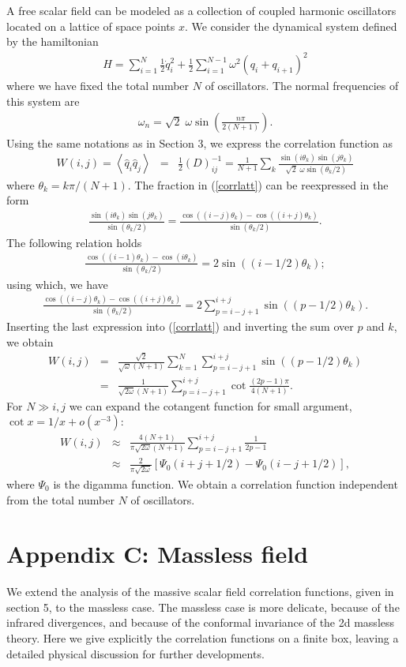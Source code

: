 \documentclass[10pt, nofootinbib]{revtex4}
\newcommand{\bea}{\begin{eqnarray}}
\newcommand{\eea}{\end{eqnarray}}
\begin{document}
A free scalar field can be modeled as a collection of coupled harmonic
oscillators located on a lattice of space points $x$.  We consider the
dynamical system defined by the hamiltonian
%
\bea H= \sum_{i=1}^{N}\frac{1}{2}\dot{q}_i^2 +
\frac{1}{2}\sum_{i=1}^{N-1} \omega^2 \left( q_i+ q_{i+1} \right)^2
\eea
%
where we have fixed the total number $N$ of oscillators.  The normal
frequencies of this system are
%
\bea \omega_{n} = \sqrt{2} \; \omega \sin \left(\frac{n \pi}{2(N+1)}
\right).  \eea
%
Using the same notations as in Section 3, we express the
correlation function as
%
\bea 
W(i,j) = \left\langle \hat{q}_i\hat{q}_j \right\rangle &=& \frac{1}{2}
\left(D\right)^{-1}_{ij} = {\frac{1}{N+1}} \sum_{k} \frac{\sin \left( i \theta_k \right)\sin
\left(j \theta_k \right)}{\sqrt{2} \; \omega \sin \left({\theta_k
}/{2} \right)}
\label{corrlatt}
\eea
%
where $\theta_k ={k \pi}/{(N+1)}$.  The fraction in (\ref{corrlatt})
can be reexpressed in the form
%
\bea \frac{\sin(i\theta_k) \sin(j \theta_k)}{\sin(\theta_k/2)}
=\frac{\cos((i-j)\theta_k) - \cos((i+j) \theta_k)}{\sin(\theta_k/2)}. 
\eea
%
The following relation holds
%
\bea \frac{\cos((i-1)\theta_k) - \cos(i \theta_k)}{\sin(\theta_k/2)} =
2 \sin((i-1/2)\theta_k); \eea
%
using which, we have
%
\bea \frac{\cos((i-j)\theta_k) - \cos((i+j)
\theta_k)}{\sin(\theta_k/2)} = 2 \sum^{i+j}_{p=i-j+1}
\sin((p-1/2)\theta_k).  \eea
%
Inserting the last expression into (\ref{corrlatt}) and inverting the
sum over $p$ and $k$, we obtain
%
\bea 
W(i,j) &=&
{\frac{\sqrt{2}}{\sqrt{\omega}(N+1)}} \sum_{k=1}^{N}
\sum^{i+j}_{p=i-j+1} \sin((p-1/2)\theta_k) \\
&=& {\frac{1}{\sqrt{2\omega}(N+1)}}\sum^{i+j}_{p=i-j+1} \cot
\frac{(2p-1) \pi}{4(N+1)}.  \eea
%
For $N \gg i,j$ we can expand the cotangent function for small
argument, $\cot x = 1/x +o(x^{-3})$:
%
\bea
W(i,j) &\approx& {\frac{4
(N+1)}{\pi \sqrt{2\omega}(N+1)}}\sum^{i+j}_{p=i-j+1} \frac{1}{2p-1} 
\nonumber\\
&\approx& \frac{2 }{\pi \sqrt{2\omega}} \left[ \Psi_0(i+j+1/2)
-\Psi_0(i-j+1/2)\right], \eea
%
where $\Psi_0$ is the digamma function.  We obtain a correlation
function independent from the total number $N$ of oscillators. 

\section*{Appendix C: Massless field}

We extend the analysis of the massive scalar field correlation
functions, given in section 5, to the massless case.  The massless
case is more delicate, because of the infrared divergences, and
because of the conformal invariance of the 2d massless theory.  Here
we give explicitly the correlation functions on a finite box, leaving
a detailed physical discussion for further developments.
\end{document}
